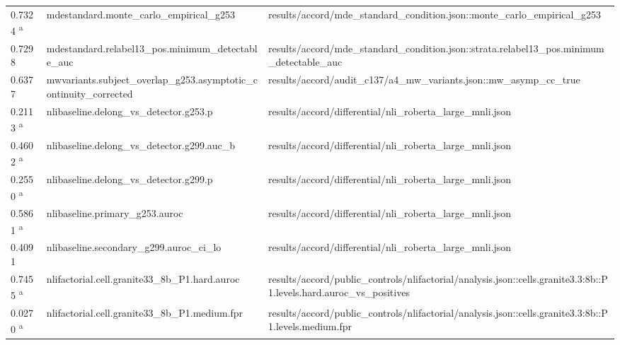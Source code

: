 \begin{longtable}{@{}p{0.7in}p{1.9in}p{2.6in}@{}}
0.7324 \textsuperscript{a} & mdestandard.\allowbreak{}monte\_carlo\_empirical\_g253 & results/\allowbreak{}accord/\allowbreak{}mde\_standard\_condition.\allowbreak{}json::monte\_carlo\_empirical\_g253\\
0.7298 & mdestandard.\allowbreak{}relabel13\_pos.\allowbreak{}minimum\_detectable\_auc & results/\allowbreak{}accord/\allowbreak{}mde\_standard\_condition.\allowbreak{}json::strata.\allowbreak{}relabel13\_pos.\allowbreak{}minimum\_detectable\_auc\\
0.6377 & mwvariants.\allowbreak{}subject\_overlap\_g253.\allowbreak{}asymptotic\_continuity\_corrected & results/\allowbreak{}accord/\allowbreak{}audit\_c137/\allowbreak{}a4\_mw\_variants.\allowbreak{}json::mw\_asymp\_cc\_true\\
0.2113 \textsuperscript{a} & nlibaseline.\allowbreak{}delong\_vs\_detector.\allowbreak{}g253.\allowbreak{}p & results/\allowbreak{}accord/\allowbreak{}differential/\allowbreak{}nli\_roberta\_large\_mnli.\allowbreak{}json\\
0.4602 \textsuperscript{a} & nlibaseline.\allowbreak{}delong\_vs\_detector.\allowbreak{}g299.\allowbreak{}auc\_b & results/\allowbreak{}accord/\allowbreak{}differential/\allowbreak{}nli\_roberta\_large\_mnli.\allowbreak{}json\\
0.2550 \textsuperscript{a} & nlibaseline.\allowbreak{}delong\_vs\_detector.\allowbreak{}g299.\allowbreak{}p & results/\allowbreak{}accord/\allowbreak{}differential/\allowbreak{}nli\_roberta\_large\_mnli.\allowbreak{}json\\
0.5861 \textsuperscript{a} & nlibaseline.\allowbreak{}primary\_g253.\allowbreak{}auroc & results/\allowbreak{}accord/\allowbreak{}differential/\allowbreak{}nli\_roberta\_large\_mnli.\allowbreak{}json\\
0.4091 & nlibaseline.\allowbreak{}secondary\_g299.\allowbreak{}auroc\_ci\_lo & results/\allowbreak{}accord/\allowbreak{}differential/\allowbreak{}nli\_roberta\_large\_mnli.\allowbreak{}json\\
0.7455 \textsuperscript{a} & nlifactorial.\allowbreak{}cell.\allowbreak{}granite33\_8b\_P1.\allowbreak{}hard.\allowbreak{}auroc & results/\allowbreak{}accord/\allowbreak{}public\_controls/\allowbreak{}nlifactorial/\allowbreak{}analysis.\allowbreak{}json::cells.\allowbreak{}granite3.\allowbreak{}3:8b::P1.\allowbreak{}levels.\allowbreak{}hard.\allowbreak{}auroc\_vs\_positives\\
0.0270 \textsuperscript{a} & nlifactorial.\allowbreak{}cell.\allowbreak{}granite33\_8b\_P1.\allowbreak{}medium.\allowbreak{}fpr & results/\allowbreak{}accord/\allowbreak{}public\_controls/\allowbreak{}nlifactorial/\allowbreak{}analysis.\allowbreak{}json::cells.\allowbreak{}granite3.\allowbreak{}3:8b::P1.\allowbreak{}levels.\allowbreak{}medium.\allowbreak{}fpr\\

\end{longtable}
